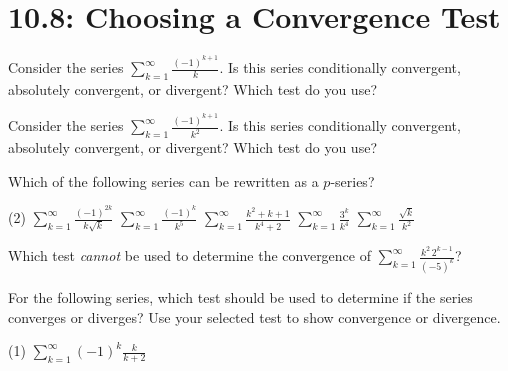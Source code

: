 \documentclass[../mathNotesPreamble]{subfiles}
\begin{document}
  \section{10.8: Choosing a Convergence Test}

  \begin{ex*}
    Consider the series $\displaystyle\sum_{k=1}^\infty \frac{(-1)^{k+1}}{k}$. Is this series conditionally convergent, absolutely convergent, or divergent? Which test do you use?
  \end{ex*}
  \pagebreak

  \begin{ex*}
    Consider the series $\displaystyle\sum_{k=1}^\infty \frac{(-1)^{k+1}}{k^2}$. Is this series conditionally convergent, absolutely convergent, or divergent? Which test do you use?
  \end{ex*}
  \pagebreak

  \begin{ex*}
    Which of the following series can be rewritten as a $p$-series?
  \end{ex*}
  \begin{tasks}[after-item-skip=\stretch{1}, label=,item-indent=0pt](2)
    \task $\displaystyle\sum_{k=1}^\infty \frac{(-1)^{2k}}{k\sqrt{k}}$
    \task $\displaystyle\sum_{k=1}^\infty \frac{(-1)^k}{k^5}$
    \task $\displaystyle\sum_{k=1}^\infty \frac{k^2+k+1}{k^4+2}$
    \task $\displaystyle\sum_{k=1}^\infty \frac{3^k}{k^4}$
    \task $\displaystyle\sum_{k=1}^\infty \frac{\sqrt{k}}{k^2}$
  \end{tasks}
  \pagebreak

  \begin{ex*}
    Which test \textit{cannot} be used to determine the convergence of $\displaystyle\sum_{k=1}^\infty \frac{k^2\,2^{k-1}}{(-5)^k}$?
  \end{ex*}

  \begin{ex*}
    For the following series, which test should be used to determine if the series converges or diverges? Use your selected test to show convergence or divergence.
  \end{ex*}
  \begin{tasks}[after-item-skip=\stretch{1}, label=,item-indent=0pt](1)
    \task $\displaystyle\sum_{k=1}^\infty (-1)^k \frac{k}{k+2}$
  \end{tasks}
  \pagebreak
\end{document}
